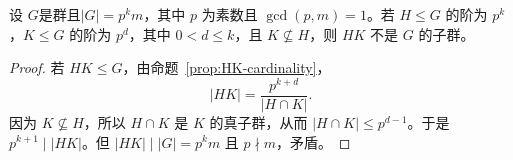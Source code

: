 \begin{proposition}\label{prop:p-subgroup-product-not-subgroup}
设 $G$是群且$|G|=p^k m$，其中 $p$ 为素数且 $\gcd(p,m)=1$。若 $H\leq G$ 的阶为 $p^k$，$K\leq G$ 的阶为 $p^d$，其中 $0<d\leq k$，且 $K\nsubseteq H$，则 $HK$ 不是 $G$ 的子群。
\end{proposition}

\begin{proof}
若 $HK\leq G$，由命题~\ref{prop:HK-cardinality}，
\[
  |HK|=\frac{p^{k+d}}{|H\cap K|}.
\]
因为 $K\nsubseteq H$，所以 $H\cap K$ 是 $K$ 的真子群，从而 $|H\cap K|\leq p^{d-1}$。于是 $p^{k+1}\mid |HK|$。但 $|HK|\mid |G|=p^k m$ 且 $p\nmid m$，矛盾。
\end{proof}
